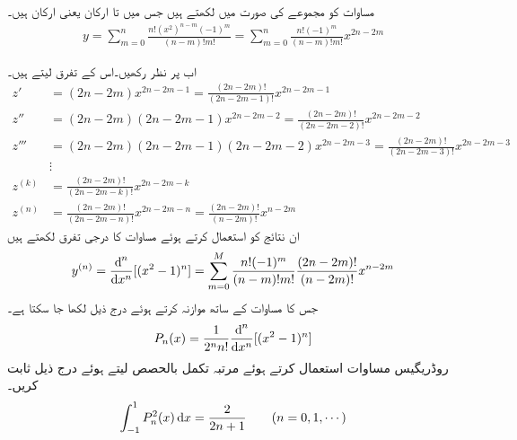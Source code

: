  مساوات  کو مجموعے کی صورت میں لکھتے ہیں جس میں  تا  ارکان  یعنی  ارکان ہیں۔
\begin{align}\label{مساوات_سوال_بیسل_الکرازی_ب}
y=\sum_{m=0}^{n} \frac{n!(x^2)^{n-m}(-1)^m}{(n-m)!m!}=\sum_{m=0}^{n} \frac{n!(-1)^m}{(n-m)!m!}x^{2n-2m}
\end{align}

اب  پر نظر رکھیں۔اس کے تفرق لیتے ہیں۔
\begin{align*}
z'&=(2n-2m)x^{2n-2m-1}=\frac{(2n-2m)!}{(2n-2m-1)!}x^{2n-2m-1}\\
z''&=(2n-2m)(2n-2m-1)x^{2n-2m-2}=\frac{(2n-2m)!}{(2n-2m-2)!}x^{2n-2m-2}\\
z'''&=(2n-2m)(2n-2m-1)(2n-2m-2)x^{2n-2m-3}=\frac{(2n-2m)!}{(2n-2m-3)!}x^{2n-2m-3}\\
&\vdots\\
z^{(k)}&=\frac{(2n-2m)!}{(2n-2m-k)!}x^{2n-2m-k}\\
z^{(n)}&=\frac{(2n-2m)!}{(2n-2m-n)!}x^{2n-2m-n}=\frac{(2n-2m)!}{(n-2m)!}x^{n-2m}
\end{align*}
ان نتائج  کو استعمال کرتے ہوئے مساوات  کا  درجی تفرق لکھتے ہیں
 \begin{align*}
y^{(n)}=\frac{\dif^{\,n}}{\dif x^n}[(x^2-1)^n]=\sum_{m=0}^{M} \frac{n!(-1)^m}{(n-m)!m!}\frac{(2n-2m)!}{(n-2m)!}x^{n-2m}
\end{align*}
جس کا مساوات  کے ساتھ موازنہ کرتے ہوئے درج ذیل لکھا جا سکتا ہے۔
\begin{align*}
P_n(x)=\frac{1}{2^n n!}\frac{\dif^{\,n}}{\dif x^n}[(x^2-1)^n]
\end{align*}
روڈریگیس مساوات  استعمال کرتے ہوئے  مرتبہ تکمل بالحصص لیتے ہوئے درج ذیل ثابت کریں۔
\begin{align*}
\int_{-1}^{1} P_n^2(x) \dif x=\frac{2}{2n+1}\quad \quad (n=0,1,\cdots)
\end{align*}

